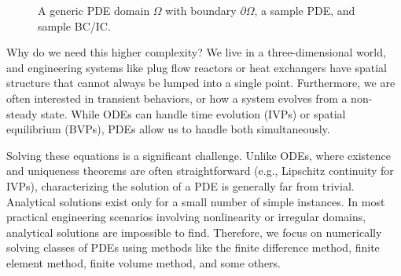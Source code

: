 \begin{figure}[H]
    \centering
    \caption{A generic PDE domain $\Omega$ with boundary $\partial \Omega$, a sample PDE, and sample BC/IC.}
    \label{fig:pde_domain}
\end{figure}

Why do we need this higher complexity? We live in a three-dimensional world, and engineering systems like plug flow reactors or heat exchangers have spatial structure that cannot always be lumped into a single point. Furthermore, we are often interested in transient behaviors, or how a system evolves from a non-steady state. While ODEs can handle time evolution (IVPs) or spatial equilibrium (BVPs), PDEs allow us to handle both simultaneously.

Solving these equations is a significant challenge. Unlike ODEs, where existence and uniqueness theorems are often straightforward (e.g., Lipschitz continuity for IVPs), characterizing the solution of a PDE is generally far from trivial. Analytical solutions exist only for a small number of simple instances. In most practical engineering scenarios involving nonlinearity or irregular domains, analytical solutions are impossible to find. Therefore, we focus on numerically solving classes of PDEs using methods like the finite difference method, finite element method, finite volume method, and some others.

